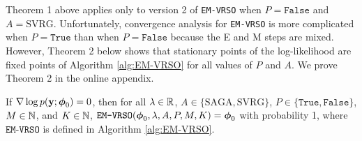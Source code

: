 


Theorem 1 above applies only to version 2 of \texttt{EM-VRSO} when $P = \texttt{False}$ and $A = \text{SVRG}$. Unfortunately, convergence analysis for \texttt{EM-VRSO} is more complicated when $P = \texttt{True}$ than when $P = \texttt{False}$ because the E and M steps are mixed. However, Theorem 2 below shows that stationary points of the log-likelihood are fixed points of Algorithm \ref{alg:EM-VRSO} for all values of $P$ and $A$. We prove Theorem 2 in the online appendix. 

\begin{theorem}
    If $\nabla \log p(\mathbf{y};\boldsymbol{\phi}_0) = 0$, then for all $\lambda \in \mathbb{R}$, $A \in \{\text{SAGA}, \text{SVRG}\}$, $P \in \{\texttt{True},\texttt{False}\}$, $M \in \mathbb{N}$, and $K \in \mathbb{N}$, $\texttt{EM-VRSO}(\boldsymbol{\phi}_0, \lambda, A, P, M, K) = \boldsymbol{\phi}_0$ with probability 1, where $\texttt{EM-VRSO}$ is defined in Algorithm \ref{alg:EM-VRSO}.
\end{theorem}

